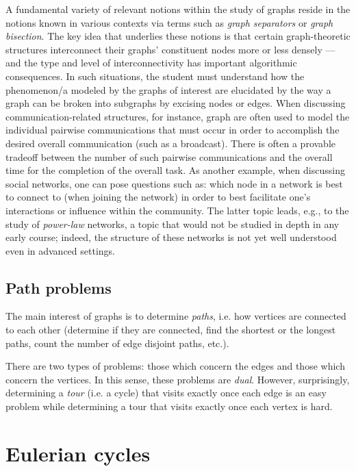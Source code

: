 A fundamental variety of relevant notions within the study of graphs
reside in the notions known in various contexts via terms such as {\em
  graph separators} or {\em graph bisection}.  The key idea that
underlies these notions is that certain graph-theoretic structures
interconnect their graphs' constituent nodes more or less densely ---
and the type and level of interconnectivity has important algorithmic
consequences.  In such situations, the student must understand how the
phenomenon/a modeled by the graphs of interest are elucidated by the
way a graph can be broken into subgraphs by excising nodes or edges.
When discussing communication-related structures, for instance, graph
are often used to model the individual pairwise communications that
must occur in order to accomplish the desired overall communication
(such as a broadcast).  There is often a provable tradeoff between the
number of such pairwise communications and the overall time for the
completion of the overall task.  As another example, when discussing
social networks, one can pose questions such as: which node in a
network is best to connect to (when joining the network) in order to
best facilitate one's interactions or influence within the community.
The latter topic leads, e.g., to the study of {\em power-law}
networks, a topic that would not be studied in depth in any early
course; indeed, the structure of these networks is not yet well
understood even in advanced settings.





\subsection{Path problems}

The main interest of graphs is to determine \textit{paths}, i.e. how vertices are connected to each other (determine if they are connected, find the shortest or the longest paths, count the number of edge disjoint paths, etc.). 

There are two types of problems: those which concern the edges and those which concern the vertices. 
In this sense, these problems are \textit{dual}.
However, surprisingly, determining a \textit{tour} (i.e. a cycle) that visits exactly once each edge is an easy problem
 while determining a tour that visits exactly once each vertex is hard. 



\section{Eulerian cycles}
\label{sec:eulerianCycle}

